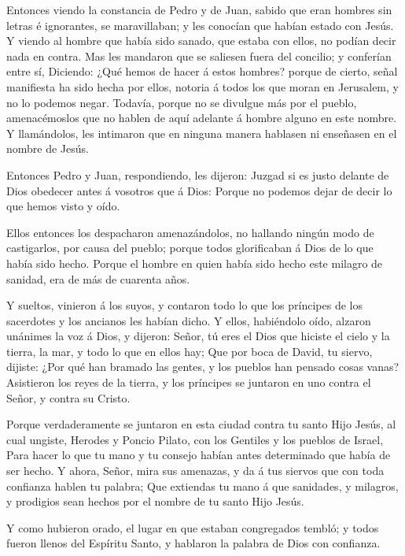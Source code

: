  Entonces viendo la constancia de Pedro y de Juan, sabido
que eran hombres sin letras é ignorantes, se maravillaban; y les
conocían que habían estado con Jesús.  Y viendo al hombre
que había sido sanado, que estaba con ellos, no podían decir nada en
contra.  Mas les mandaron que se saliesen fuera del
concilio; y conferían entre sí,  Diciendo: ¿Qué hemos de
hacer á estos hombres? porque de cierto, señal manifiesta ha sido hecha
por ellos, notoria á todos los que moran en Jerusalem, y no lo podemos
negar.  Todavía, porque no se divulgue más por el pueblo,
amenacémoslos que no hablen de aquí adelante á hombre alguno en este
nombre.  Y llamándolos, les intimaron que en ninguna manera
hablasen ni enseñasen en el nombre de Jesús.

 Entonces Pedro y Juan, respondiendo, les dijeron: Juzgad
si es justo delante de Dios obedecer antes á vosotros que á Dios:
 Porque no podemos dejar de decir lo que hemos visto y
oído.

 Ellos entonces los despacharon amenazándolos, no hallando
ningún modo de castigarlos, por causa del pueblo; porque todos
glorificaban á Dios de lo que había sido hecho.  Porque el
hombre en quien había sido hecho este milagro de sanidad, era de más de
cuarenta años.

 Y sueltos, vinieron á los suyos, y contaron todo lo que
los príncipes de los sacerdotes y los ancianos les habían dicho.
 Y ellos, habiéndolo oído, alzaron unánimes la voz á Dios,
y dijeron: Señor, tú eres el Dios que hiciste el cielo y la tierra, la
mar, y todo lo que en ellos hay;  Que por boca de David, tu
siervo, dijiste: ¿Por qué han bramado las gentes, y los pueblos han
pensado cosas vanas?  Asistieron los reyes de la tierra, y
los príncipes se juntaron en uno contra el Señor, y contra su Cristo.

 Porque verdaderamente se juntaron en esta ciudad contra tu
santo Hijo Jesús, al cual ungiste, Herodes y Poncio Pilato, con los
Gentiles y los pueblos de Israel,  Para hacer lo que tu
mano y tu consejo habían antes determinado que había de ser hecho.
 Y ahora, Señor, mira sus amenazas, y da á tus siervos que
con toda confianza hablen tu palabra;  Que extiendas tu
mano á que sanidades, y milagros, y prodigios sean hechos por el nombre
de tu santo Hijo Jesús.

 Y como hubieron orado, el lugar en que estaban congregados
tembló; y todos fueron llenos del Espíritu Santo, y hablaron la palabra
de Dios con confianza.

